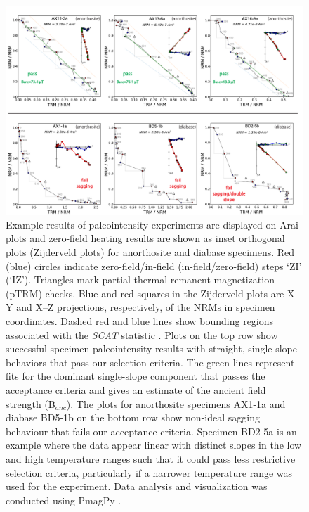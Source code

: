 \documentclass[9pt,twocolumn,twoside,lineno]{pnas-new}
\begin{document}
\begin{figure}
\noindent\includegraphics[width=17.8cm]{IZZI_examples.pdf}
\centering
\caption{\footnotesize{Example results of paleointensity experiments are displayed on Arai plots and zero-field heating results are shown as inset orthogonal plots (Zijderveld plots) for anorthosite and diabase specimens. Red (blue) circles indicate zero-field/in-field (in-field/zero-field) steps `ZI’ (`IZ’). Triangles mark partial thermal remanent magnetization (pTRM) checks. Blue and red squares in the Zijderveld plots are X–Y and X–Z projections, respectively, of the NRMs in specimen coordinates. Dashed red and blue lines show bounding regions associated with the \textit{SCAT} statistic \cite{Shaar2013a}. Plots on the top row show successful specimen paleointensity results with straight, single-slope behaviors that pass our selection criteria. The green lines represent fits for the dominant single-slope component that passes the acceptance criteria and gives an estimate of the ancient field strength (B$_{anc}$). The plots for anorthosite specimens AX1-1a and diabase BD5-1b on the bottom row show non-ideal sagging behaviour that fails our acceptance criteria. Specimen BD2-5a is an example where the data appear linear with distinct slopes in the low and high temperature ranges such that it could pass less restrictive selection criteria, particularly if a narrower temperature range was used for the experiment. Data analysis and visualization was conducted using PmagPy \cite{Tauxe2016a}.}}
\label{fig:IZZI_examples}
\end{figure}
\end{document}
